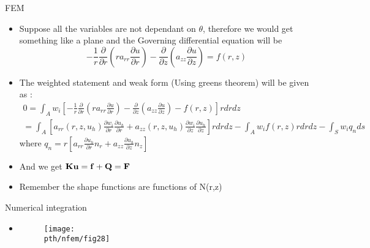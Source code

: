 	\begin{frame}{FEM}
		\begin{itemize}
			\item Suppose all the variables are not dependant on $\theta$, therefore we would get something like a plane and the Governing differential equation will be
			\begin{equation}
				-\frac{1}{r}\frac{\partial}{\partial r}\left(ra_{rr}\frac{\partial u}{\partial r} \right)
				- \frac{\partial}{\partial z}\left(a_{zz}\frac{\partial u}{\partial z} \right) = f(r,z)
			\end{equation}
			\item The weighted statement and weak form (Using greens theorem) will be given as :
			\begin{equation}
			\begin{aligned}
			 0 = \int_A w_i \left[ 	-\frac{1}{r}\frac{\partial}{\partial r}\left(ra_{rr}\frac{\partial u}{\partial r} \right)
			 - \frac{\partial}{\partial z}\left(a_{zz}\frac{\partial u}{\partial z} \right) - f(r,z)\right] rdrdz \\
			 = \int_A \left[ a_{rr}(r,z,u_h) \frac{\partial w_i}{\partial r}\frac{\partial u_h}{\partial r}
			 + a_{zz}(r,z,u_h) \frac{\partial w_i}{\partial z} \frac{\partial u_h}{\partial z}\right] rdrdz - \int_A w_if(r,z)rdrdz - \int_S w_iq_n ds 
			\end{aligned}
			\end{equation}
			where $q_n = r\left[ a_{rr} \frac{\partial u_h}{\partial r}n_r + a_{zz}\frac{\partial u_h}{\partial z} n_z\right]$
			\item And we get $\mathbf{Ku = f+Q = F}$
			\item Remember the shape functions are functions of N(r,z)	
	\end{itemize}
	\end{frame}


	\begin{frame}{Numerical integration}
		\begin{itemize}
			\item
			\begin{figure}
				\centering
				\texttt{[image: \\pth/nfem/fig28]} 		
			\end{figure} 
			
		\end{itemize}
	\end{frame}

